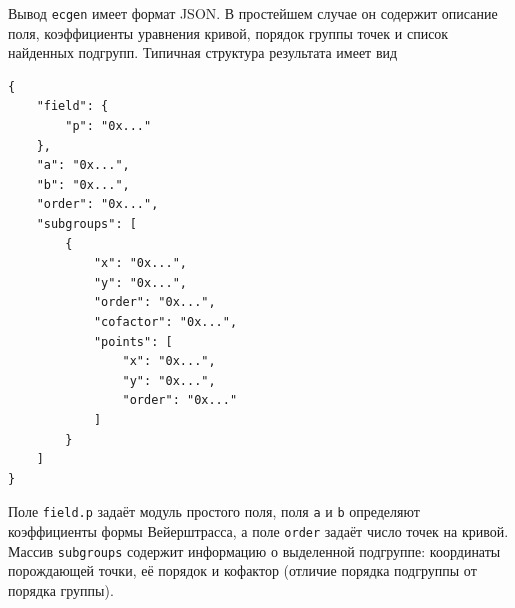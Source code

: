 Вывод \texttt{ecgen} имеет формат JSON. В простейшем случае он содержит описание поля, коэффициенты уравнения кривой, порядок группы точек и список найденных подгрупп. Типичная структура результата имеет вид
\begin{verbatim}
{
    "field": {
        "p": "0x..."
    },
    "a": "0x...",
    "b": "0x...",
    "order": "0x...",
    "subgroups": [
        {
            "x": "0x...",
            "y": "0x...",
            "order": "0x...",
            "cofactor": "0x...",
            "points": [
                "x": "0x...",
                "y": "0x...",
                "order": "0x..."
            ]
        }
    ]
}
\end{verbatim}

Поле \texttt{field.p} задаёт модуль простого поля, поля \texttt{a} и \texttt{b} определяют коэффициенты формы Вейерштрасса, а поле \texttt{order} задаёт число точек на кривой. Массив \texttt{subgroups} содержит информацию о выделенной подгруппе: координаты порождающей точки, её порядок и кофактор (отличие порядка подгруппы от порядка группы).